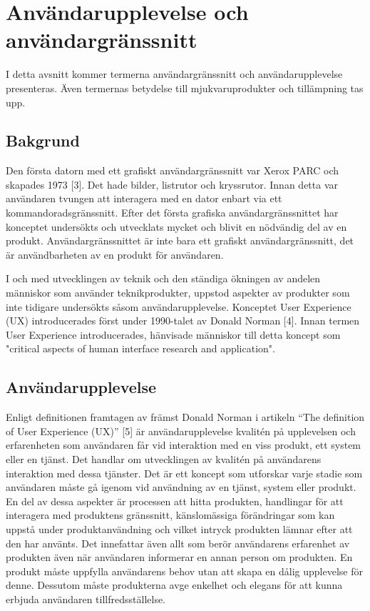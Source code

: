 \documentclass[12pt]{kththesis}
\begin{document}
\section{Användarupplevelse och användargränssnitt} 
I detta avsnitt kommer termerna användargränssnitt och användarupplevelse presenteras. Även termernas betydelse till mjukvaruprodukter och tillämpning tas upp.

\subsection{Bakgrund} 

Den första datorn med ett grafiskt användargränssnitt var Xerox PARC och skapades 1973 [3]. Det hade bilder, listrutor och kryssrutor. Innan detta var användaren tvungen att interagera med en dator enbart via ett kommandoradsgränssnitt. Efter det första grafiska användargränssnittet har konceptet undersökts och utvecklats mycket och blivit en nödvändig del av en produkt. Användargränssnittet är inte bara ett grafiskt användargränssnitt, det är användbarheten av en produkt för användaren.

I och med utvecklingen av teknik och den ständiga ökningen av andelen människor som använder teknikprodukter, uppstod aspekter av produkter som inte tidigare undersökts såsom användarupplevelse. Konceptet User Experience (UX) introducerades först under 1990-talet av Donald Norman [4]. Innan termen User Experience introducerades, hänvisade människor till detta koncept som "critical aspects of human interface research and application".

\subsection{Användarupplevelse}
 
Enligt definitionen framtagen av främst Donald Norman i artikeln “The definition of User Experience (UX)” [5] är användarupplevelse kvalitén på upplevelsen och erfarenheten som användaren får vid interaktion med en viss produkt, ett system eller en tjänst. Det handlar om utvecklingen av kvalitén på användarens interaktion med dessa tjänster. Det är ett koncept som utforskar varje stadie som användaren måste gå igenom vid användning av en tjänst, system eller produkt. En del av dessa aspekter är processen att hitta produkten, handlingar för att interagera med produktens gränssnitt, känslomässiga förändringar som kan uppstå under produktanvändning och vilket intryck produkten lämnar efter att den har använts. Det innefattar även allt som berör användarens erfarenhet av produkten även när användaren informerar en annan person om produkten. En produkt måste uppfylla användarens behov utan att skapa en dålig upplevelse för denne. Dessutom måste produkterna avge enkelhet och elegans för att kunna erbjuda användaren tillfredsställelse. 
\end{document}
